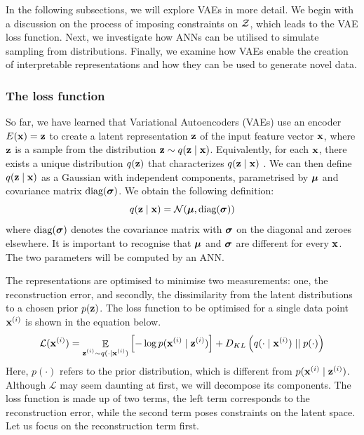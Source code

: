 In the following subsections, we will explore VAEs in more detail. We begin with a discussion on the process of imposing constraints on $\mathcal{Z}$, which leads to the VAE loss function. Next, we investigate how ANNs can be utilised to simulate sampling from distributions. Finally, we examine how VAEs enable the creation of interpretable representations and how they can be used to generate novel data.




\subsubsection{The loss function}	

	So far, we have learned that Variational Autoencoders (VAEs) use an encoder $E(\mathbf{x}) = \mathbf{z}$ to create a latent representation $\mathbf{z}$ of the input feature vector $\mathbf{x}$, where $\mathbf{z}$ is a sample from the distribution $\mathbf{z} \sim q (\mathbf{z} \mid \mathbf{x})$. Equivalently, for each $\mathbf{x}$, there exists a unique distribution $q(\mathbf{z})$ that characterizes $q (\mathbf{z} \mid \mathbf{x})$ \citep{volodymyrkuleshovVariationalAutoencoder2023}. We can then define $q (\mathbf{z} \mid \mathbf{x})$ as a Gaussian with independent components, parametrised by $\bm{\mu}$ and covariance matrix $\text{diag}(\bm{\sigma})$. We obtain the following definition:
	\begin{equation}
		q (\mathbf{z} \mid \mathbf{x}) = \mathcal{N}(\bm{\mu} , \text{diag}(\bm{\sigma})) \label{eq:definition_q}
	\end{equation}
	where $\text{diag}(\bm{\sigma})$ denotes the covariance matrix with $\bm{\sigma}$ on the diagonal and zeroes elsewhere. It is important to recognise that $\bm{\mu}$ and $\bm{\sigma}$ are different for every $\mathbf{x}$. The two parameters will be computed by an ANN.


	The representations are optimised to minimise two measurements: one, the reconstruction error, and secondly, the dissimilarity from the latent distributions to a chosen prior $p(\mathbf{z})$. %
	The loss function to be optimised for a single data point $\mathbf{x}^{(i)}$ is shown in the equation below.
	\begin{equation}
		\mathcal{L} (\mathbf{x}^{(i)}) = \mathop{\mathbb{E}}_{\substack{\mathbf{z}^{(i)} \sim q (\cdot \mid \mathbf{x}^{(i)})}} \left[ -\log p (\mathbf{x}^{(i)} \mid \mathbf{z}^{(i)}) \right] + D_{KL} \left(  q (\cdot \mid \mathbf{x}^{(i)})  \mid \mid  p(\cdot)  \right) \label{eq:elbo_explicit_intial}
	\end{equation} %
	Here, $p(\cdot)$ refers to the prior distribution, which is different from $p (\mathbf{x}^{(i)} \mid \mathbf{z}^{(i)})$.
	Although $\mathcal{L}$ may seem daunting at first, we will decompose its components. The loss function is made up of two terms, the left term corresponds to the reconstruction error, while the second term poses constraints on the latent space. Let us focus on the reconstruction term first.
	
